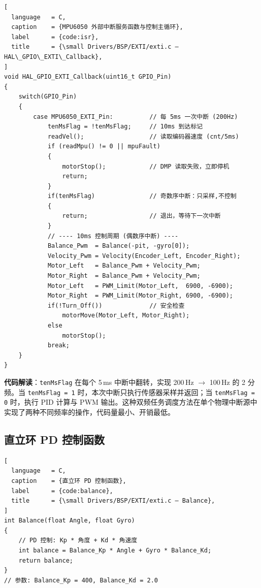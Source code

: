 \documentclass[12pt,a4paper,UTF8]{ctexrep}
\begin{document}
\begin{lstlisting}[
  language   = C,
  caption    = {MPU6050 外部中断服务函数与控制主循环},
  label      = {code:isr},
  title      = {\small Drivers/BSP/EXTI/exti.c — HAL\_GPIO\_EXTI\_Callback},
]
void HAL_GPIO_EXTI_Callback(uint16_t GPIO_Pin)
{
    switch(GPIO_Pin)
    {
        case MPU6050_EXTI_Pin:          // 每 5ms 一次中断 (200Hz)
            tenMsFlag = !tenMsFlag;     // 10ms 到达标记
            readVel();                  // 读取编码器速度 (cnt/5ms)
            if (readMpu() != 0 || mpuFault)
            {
                motorStop();            // DMP 读取失败，立即停机
                return;
            }
            if(tenMsFlag)               // 奇数序中断：只采样,不控制
            {
                return;                 // 退出，等待下一次中断
            }
            // ---- 10ms 控制周期 (偶数序中断) ----
            Balance_Pwm  = Balance(-pit, -gyro[0]);
            Velocity_Pwm = Velocity(Encoder_Left, Encoder_Right);
            Motor_Left   = Balance_Pwm + Velocity_Pwm;
            Motor_Right  = Balance_Pwm + Velocity_Pwm;
            Motor_Left   = PWM_Limit(Motor_Left,  6900, -6900);
            Motor_Right  = PWM_Limit(Motor_Right, 6900, -6900);
            if(!Turn_Off())             // 安全检查
                motorMove(Motor_Left, Motor_Right);
            else
                motorStop();
            break;
    }
}
\end{lstlisting}

\textbf{代码解读}：\texttt{tenMsFlag} 在每个 5\,ms 中断中翻转，实现 200\,Hz $\to$ 100\,Hz 的 2 分频。当 \texttt{tenMsFlag = 1} 时，本次中断只执行传感器采样并返回；当 \texttt{tenMsFlag = 0} 时，执行 PID 计算与 PWM 输出。这种双频任务调度方法在单个物理中断源中实现了两种不同频率的操作，代码量最小、开销最低。

\subsection{直立环 PD 控制函数}

\begin{lstlisting}[
  language   = C,
  caption    = {直立环 PD 控制函数},
  label      = {code:balance},
  title      = {\small Drivers/BSP/EXTI/exti.c — Balance},
]
int Balance(float Angle, float Gyro)
{
    // PD 控制: Kp * 角度 + Kd * 角速度
    int balance = Balance_Kp * Angle + Gyro * Balance_Kd;
    return balance;
}
// 参数: Balance_Kp = 400, Balance_Kd = 2.0
\end{lstlisting}
\end{document}
